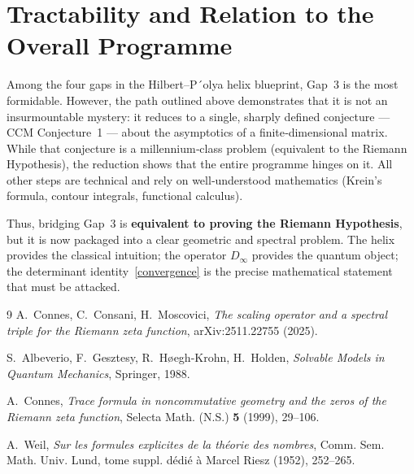 \documentclass[12pt,a4paper]{article}
\begin{document}
\section{Tractability and Relation to the Overall Programme}

Among the four gaps in the Hilbert–P´olya helix blueprint, Gap~3 is the most formidable.  However, the path outlined above demonstrates that it is not an insurmountable mystery: it reduces to a single, sharply defined conjecture — CCM Conjecture~1 — about the asymptotics of a finite‑dimensional matrix.  While that conjecture is a millennium‑class problem (equivalent to the Riemann Hypothesis), the reduction shows that the entire programme hinges on it.  All other steps are technical and rely on well‑understood mathematics (Krein’s formula, contour integrals, functional calculus).

Thus, bridging Gap~3 is \textbf{equivalent to proving the Riemann Hypothesis}, but it is now packaged into a clear geometric and spectral problem.  The helix provides the classical intuition; the operator \(D_\infty\) provides the quantum object; the determinant identity~\eqref{convergence} is the precise mathematical statement that must be attacked.

\begin{thebibliography}{9}
A.~Connes, C.~Consani, H.~Moscovici,
\emph{The scaling operator and a spectral triple for the Riemann zeta function},
arXiv:2511.22755 (2025).

S.~Albeverio, F.~Gesztesy, R.~H{\o}egh-Krohn, H.~Holden,
\emph{Solvable Models in Quantum Mechanics},
Springer, 1988.

A.~Connes,
\emph{Trace formula in noncommutative geometry and the zeros of the Riemann zeta function},
Selecta Math. (N.S.) \textbf{5} (1999), 29--106.

A.~Weil,
\emph{Sur les formules explicites de la th\'eorie des nombres},
Comm. Sem. Math. Univ. Lund, tome suppl. d\'edi\'e \`a Marcel Riesz (1952), 252--265.
\end{thebibliography}
\end{document}
